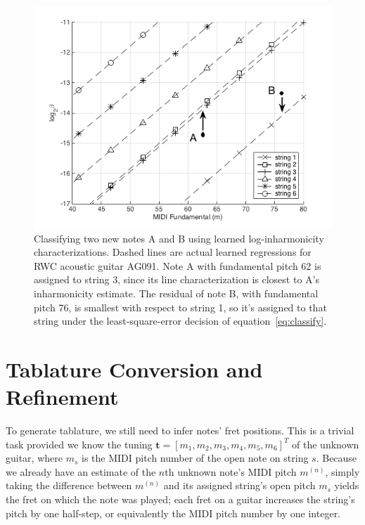 \documentclass[12pt]{cmuthesis}
\begin{document}
\begin{figure}[!htbp] 
\label{fig:classify}
\centering
\includegraphics[scale=0.75]{classify}
\caption{Classifying two new notes A and B using learned log-inharmonicity characterizations. Dashed lines are actual learned regressions for RWC acoustic guitar AG091. Note A with fundamental pitch 62 is assigned to string 3, since its line characterization is closest to A's inharmonicity estimate. The residual of note B, with fundamental pitch 76, is smallest with respect to string 1, so it's assigned to that string under the least-square-error decision of equation~\eqref{eq:classify}.}
\end{figure}



\section{Tablature Conversion and Refinement}
To generate tablature, we still need to infer notes' fret positions. This is a trivial task provided we know the tuning $\mathbf{t} = [m_1, m_2, m_3, m_4, m_5, m_6]^T$ of the unknown guitar, where $m_s$ is the MIDI pitch number of the open note on string $s$. Because we already have an estimate of the $n$th unknown note's MIDI pitch $m^{(n)}$, simply taking the difference between $m^{(n)}$ and its assigned string's open pitch $m_s$ yields the fret on which the note was played; each fret on a guitar increases the string's pitch by one half-step, or equivalently the MIDI pitch number by one integer.
\end{document}

